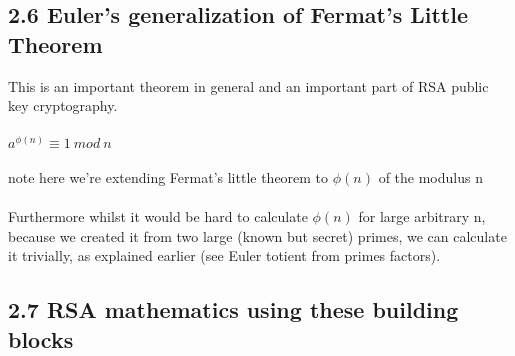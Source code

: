 \documentclass[11pt]{article}   	%
\begin{document}
\subsection*{2.6 Euler’s generalization of Fermat’s Little Theorem}

This is an important theorem in general and an important part of RSA public key cryptography.  \\
\\
$ a^{\phi(n)} \equiv 1 \ mod \ n $ \\
\\
note here we're extending Fermat's little theorem to $ \phi(n) $ of the modulus n \\
\\
Furthermore whilst it would be hard to calculate $ \phi(n) $ for large arbitrary n, because we created it from two large (known but secret) primes, we can calculate it trivially, as explained earlier (see Euler totient from primes factors).


\subsection*{2.7 RSA mathematics using these building blocks}
\end{document}
